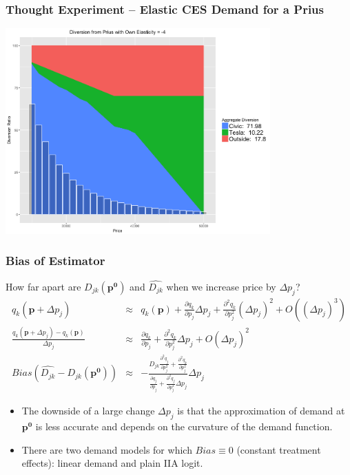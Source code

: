 \documentclass[xcolor=pdftex,dvipsnames,table,mathserif]{beamer}
\begin{document}
\begin{frame}
\frametitle{Thought Experiment -- Elastic CES Demand for a Prius}
\begin{center}
\includegraphics[width=4in]{./resources/new_prius4.png}
\end{center}
\end{frame}


\begin{frame}
\frametitle{Bias of Estimator}
\footnotesize
How far apart are $D_{jk}(\mathbf{p^0})$ and $\widehat{D_{jk}}$ when we increase price by $\Delta p_j$? 
\begin{eqnarray*}
\nonumber q_k(\mathbf{p}+ \Delta p_j) &\approx& q_k(\mathbf{p}) + \frac{\partial q_k}{\partial p_j} \Delta p_j + \frac{\partial^2 q_k}{\partial p_j^2} (\Delta p_j)^2 + O((\Delta p_j)^3) \\
\frac{ q_k(\mathbf{p}+ \Delta p_j)-q_k(\mathbf{p}) }{\Delta p_j} &\approx& \frac{\partial q_k}{\partial p_j}+ \frac{\partial^2 q_k}{\partial p_j^2} \Delta p_j + O(\Delta p_j)^2 \\
Bias(\widehat{D_{jk}} -D_{jk}(\mathbf{p^0})) &\approx& -  \frac{D_{jk} \frac{\partial^2 q_j}{\partial p_j^2} +  \frac{\partial^2 q_k}{\partial p_j^2} }{\frac{\partial q_j}{\partial p_j} + \frac{\partial^2 q_j}{\partial p_j^2}\Delta p_j } \Delta p_j
\end{eqnarray*}
\begin{itemize}
\item The downside of a large change $\Delta p_j$ is that the approximation of demand at $\mathbf{p^0}$ is less accurate and depends on the curvature of the demand function.
\item There are two demand models for which $Bias \equiv 0$ \alert{(constant treatment effects)}: \pause linear demand and plain IIA logit.
\end{itemize}
\end{frame}
\end{document}
